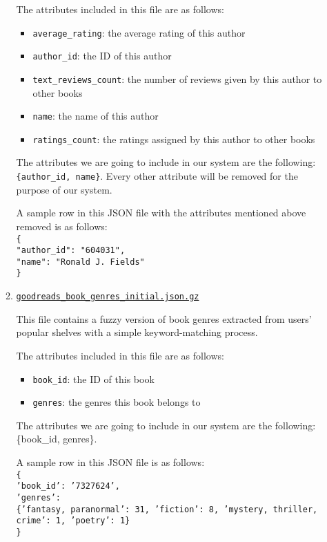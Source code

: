 \documentclass[fontsize=11pt]{article}
\begin{document}
\begin{itemize}
\begin{enumerate}
The attributes included in this file are as follows:
\begin{itemize}
  \item \texttt{average\_rating}: the average rating of this author
  \item \texttt{author\_id}: the ID of this author
  \item \texttt{text\_reviews\_count}: the number of reviews given by this author to other books
  \item \texttt{name}: the name of this author
  \item \texttt{ratings\_count}: the ratings assigned by this author to other books
\end{itemize}
The attributes we are going to include in our system are the following:
\texttt{\{author\_id, name\}}. Every other attribute will be removed for the purpose of our system.
 
A sample row in this JSON file with the attributes mentioned above removed is as follows: \\
\texttt{\{\\
"author\_id": "604031", \\
"name": "Ronald J. Fields"\\
\}} \\
 
\item \texttt{\href{https://drive.google.com/uc?id=1ah0_KpUterVi-AHxJ03iKD6O0NfbK0md}{goodreads\_book\_genres\_initial.json.gz}}
 
This file contains a fuzzy version of book genres extracted from users’ popular shelves with a simple keyword-matching process.
 
The attributes included in this file are as follows:
\begin{itemize}
  \item \texttt{book\_id}: the ID of this book
  \item \texttt{genres}: the genres this book belongs to
\end{itemize}
The attributes we are going to include in our system are the following:
\{book\_id, genres\}.
 
A sample row in this JSON file is as follows: \\
\texttt{\{\\
'book\_id': '7327624',\\
'genres': \\
\{'fantasy, paranormal': 31, 'fiction': 8, 'mystery, thriller, crime': 1, 'poetry': 1\}\\
\}}
\end{enumerate}


\end{itemize}
\end{document}
